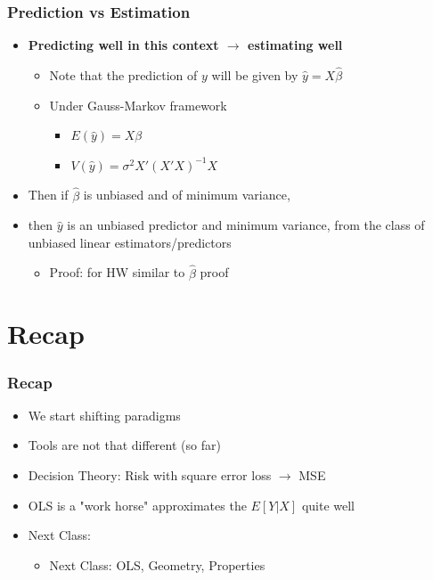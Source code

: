 \documentclass[
  shownotes,
  xcolor={svgnames},
  hyperref={colorlinks,citecolor=DarkBlue,linkcolor=DarkRed,urlcolor=DarkBlue}
  , aspectratio=169]{beamer}
\begin{document}
\begin{frame}
\frametitle{Prediction vs Estimation}

\begin{itemize}
\item {\bf Predicting well in this context $\rightarrow$ estimating well}

  \bigskip 
\begin{itemize}
  \item Note that the prediction of $y$ will be given by $\hat y=X \hat \beta$
  \bigskip 
  \item Under Gauss-Markov framework
  
  \begin{itemize}
    \item $E(\hat y) = X\beta$
    \medskip 
    \item $V(\hat y ) = \sigma^2 X' (X'X)^{-1} X$
  \end{itemize}
\end{itemize}

  \bigskip 

\item Then if $\hat \beta$ is unbiased and of minimum variance, 
\item then $\hat y$ is an unbiased predictor and minimum variance, from the class of unbiased linear estimators/predictors
  \begin{itemize}
    \tiny 
    \item Proof: for HW similar to $\hat \beta$ proof
  \end{itemize}
\end{itemize}
\end{frame}




\section{Recap}
\begin{frame}
\frametitle{Recap}

\begin{itemize}
    \item We start shifting paradigms
    \medskip
    \item Tools are not that different (so far)
    \medskip
    \item Decision Theory: Risk with square error loss $\rightarrow$ MSE
    \medskip
    \item OLS is a "work horse" approximates the $E[Y|X]$ quite well 
    \medskip
    \item Next Class:
    \medskip
    \begin{itemize}
    \item  Next Class: OLS, Geometry, Properties
    \end{itemize}
     
\end{itemize}
\end{frame}
\end{document}
